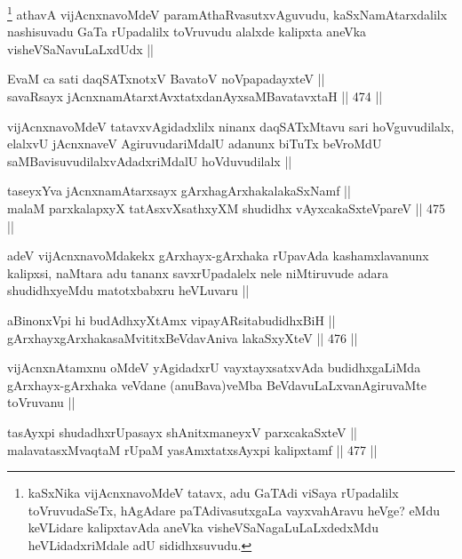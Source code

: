 \begin{artha}
\footnote{kaSxNika vijAcnxnavoMdeV tatavx, adu GaTAdi viSaya rUpadalilx toVruvudaSeTx, hAgAdare paTAdivasutxgaLa vayxvahAravu heVge? eMdu keVLidare kalipxtavAda aneVka visheVSaNagaLuLaLxdedxMdu heVLidadxriMdale adU sididhxsuvudu.} athavA vijAcnxnavoMdeV paramAthaRvasutxvAguvudu, kaSxNamAtarxdalilx nashisuvadu GaTa rUpadalilx toVruvudu alalxde kalipxta aneVka visheVSaNavuLaLxdUdx ||
\end{artha}

\begin{shl}
EvaM ca sati daqSATxnotxV BavatoV noVpapadayxteV || \\
savaRsayx jAcnxnamAtarxtAvxtatxdanAyxsaMBavatavxtaH ||  474 ||  
\end{shl}

\begin{artha}
vijAcnxnavoMdeV tatavxvAgidadxlilx ninanx daqSATxMtavu sari hoVguvudilalx, elalxvU jAcnxnaveV AgiruvudariMdalU adanunx biTuTx beVroMdU saMBavisuvudilalxvAdadxriMdalU hoVduvudilalx ||
\end{artha}

\begin{shl}
taseyxYva jAcnxnamAtarxsayx gArxhagArxhakalakaSxNamf || \\
malaM parxkalapxyX tatAsxvXsathxyXM shudidhx vAyxcakaSxteV\s pareV ||  475 ||  
\end{shl}

\begin{artha}
adeV vijAcnxnavoMdakekx gArxhayx-gArxhaka rUpavAda kashamxlavanunx kalipxsi, naMtara adu tananx savxrUpadalelx nele niMtiruvude adara shudidhxyeMdu matotxbabxru heVLuvaru ||
\end{artha}

\begin{shl}
aBinonxV\s pi hi budAdhxyXtAmx vipayARsitabudidhxBiH || \\
gArxhayxgArxhakasaMvititxBeVdavAniva lakaSxyXteV ||  476 ||  
\end{shl}

\begin{artha}
vijAcnxnAtamxnu oMdeV yAgidadxrU vayxtayxsatxvAda budidhxgaLiMda gArxhayx-gArxhaka veVdane (anuBava)veMba BeVdavuLaLxvanAgiruvaMte toVruvanu ||
\end{artha}


\begin{shl}
tasAyxpi shudadhxrUpasayx shAnitxmaneyxV parxcakaSxteV || \\
malavatasxMvaqtaM rUpaM yasAmxtatxsAyxpi kalipxtamf ||  477 ||  
\end{shl}

